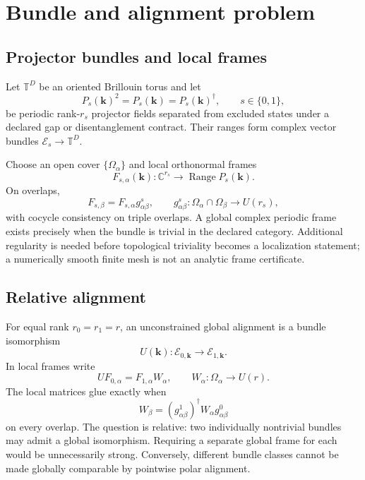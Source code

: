 \documentclass[11pt]{article}
\newenvironment{prospective}{\color{prospectivered}}{}
\begin{document}
\begin{prospective}
\section{Bundle and alignment problem}

\subsection{Projector bundles and local frames}
Let $\mathbb T^D$ be an oriented Brillouin torus and let
\begin{equation}
 P_s(\mathbf k)^2=P_s(\mathbf k)=P_s(\mathbf k)^\dagger,
 \qquad s\in\{0,1\},
\end{equation}
be periodic rank-$r_s$ projector fields separated from excluded states under a declared
gap or disentanglement contract. Their ranges form complex vector bundles
$\mathcal E_s\rightarrow\mathbb T^D$.

Choose an open cover $\{\Omega_\alpha\}$ and local orthonormal frames
\begin{equation}
 F_{s,\alpha}(\mathbf k):\mathbb C^{r_s}\rightarrow
 \operatorname{Range}P_s(\mathbf k).
\end{equation}
On overlaps,
\begin{equation}
 F_{s,\beta}=F_{s,\alpha}g^s_{\alpha\beta},
 \qquad g^s_{\alpha\beta}:\Omega_\alpha\cap\Omega_\beta\rightarrow U(r_s),
\end{equation}
with cocycle consistency on triple overlaps. A global complex periodic frame exists
precisely when the bundle is trivial in the declared category. Additional regularity is
needed before topological triviality becomes a localization statement; a numerically
smooth finite mesh is not an analytic frame certificate.

\subsection{Relative alignment}
For equal rank $r_0=r_1=r$, an unconstrained global alignment is a bundle isomorphism
\begin{equation}
 U(\mathbf k):\mathcal E_{0,\mathbf k}\rightarrow\mathcal E_{1,\mathbf k}.
\end{equation}
In local frames write
\begin{equation}
 UF_{0,\alpha}=F_{1,\alpha}W_\alpha,
 \qquad W_\alpha:\Omega_\alpha\rightarrow U(r).
\end{equation}
The local matrices glue exactly when
\begin{equation}
 W_\beta=(g^1_{\alpha\beta})^\dagger W_\alpha g^0_{\alpha\beta}
 \label{eq:glue}
\end{equation}
on every overlap. The question is relative: two individually nontrivial bundles may
admit a global isomorphism. Requiring a separate global frame for each would be
unnecessarily strong. Conversely, different bundle classes cannot be made globally
comparable by pointwise polar alignment.


\end{prospective}
\end{document}
